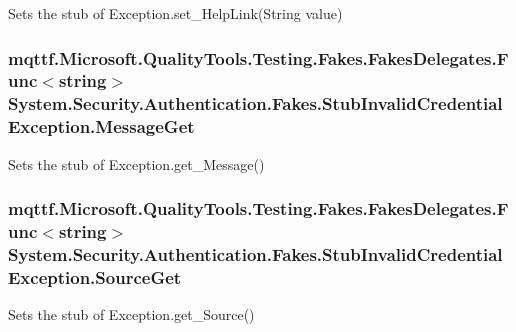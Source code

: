 Sets the stub of Exception.\-set\-\_\-\-Help\-Link(\-String value)

\hypertarget{class_system_1_1_security_1_1_authentication_1_1_fakes_1_1_stub_invalid_credential_exception_a9427811d4af17e302af42161d1bd2cf8}{
\subsubsection[{Message\-Get}]{\setlength{\rightskip}{0pt plus 5cm}mqttf.\-Microsoft.\-Quality\-Tools.\-Testing.\-Fakes.\-Fakes\-Delegates.\-Func$<$string$>$ System.\-Security.\-Authentication.\-Fakes.\-Stub\-Invalid\-Credential\-Exception.\-Message\-Get}}\label{class_system_1_1_security_1_1_authentication_1_1_fakes_1_1_stub_invalid_credential_exception_a9427811d4af17e302af42161d1bd2cf8}


Sets the stub of Exception.\-get\-\_\-\-Message()

\hypertarget{class_system_1_1_security_1_1_authentication_1_1_fakes_1_1_stub_invalid_credential_exception_a52a5dfa90a209bfe5bf67d39c2e82103}{
\subsubsection[{Source\-Get}]{\setlength{\rightskip}{0pt plus 5cm}mqttf.\-Microsoft.\-Quality\-Tools.\-Testing.\-Fakes.\-Fakes\-Delegates.\-Func$<$string$>$ System.\-Security.\-Authentication.\-Fakes.\-Stub\-Invalid\-Credential\-Exception.\-Source\-Get}}\label{class_system_1_1_security_1_1_authentication_1_1_fakes_1_1_stub_invalid_credential_exception_a52a5dfa90a209bfe5bf67d39c2e82103}


Sets the stub of Exception.\-get\-\_\-\-Source()

